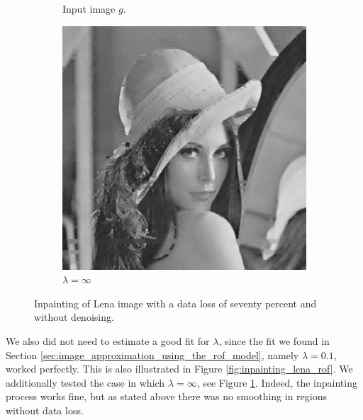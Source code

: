 \documentclass[abstracton]{scrreprt}
\begin{document}
\begin{figure}[!ht]
\begin{subfigure}[b]{0.30\textwidth}
                \caption{Input image $g$.}
            \end{subfigure}
            \begin{subfigure}[b]{0.30\textwidth}
                \includegraphics[width=\textwidth]{img/inpainting/pwclena.png}
                \caption{$\lambda = \infty$}
            \end{subfigure}
            \caption[Inpainting with seventy percent data loss without denoising.]{Inpainting of Lena image with a data loss of seventy percent and without denoising.}
        \label{fig:inpainting_lena_rof_pwc}
        \end{figure}
        We also did not need to estimate a good fit for $\lambda$, since the fit we found in Section \ref{sec:image_approximation_using_the_rof_model}, namely $\lambda = 0.1$, worked perfectly. This is also illustrated in Figure \ref{fig:inpainting_lena_rof}. We additionally tested the case in which $\lambda = \infty$, see Figure \ref{fig:inpainting_lena_rof_pwc}. Indeed, the inpainting process works fine, but as stated above there was no smoothing in regions without data loss.\\
\end{document}
